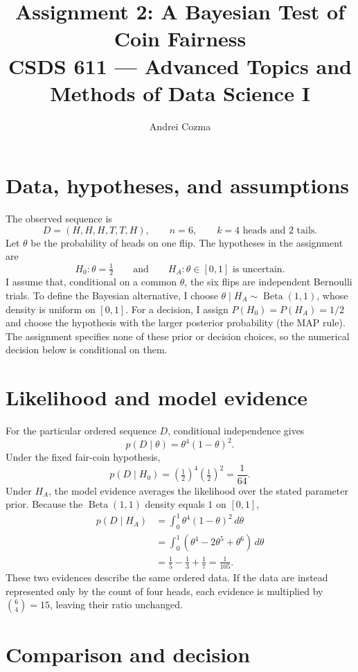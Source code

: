 \documentclass[11pt,letterpaper]{article}
\title{%
  Assignment 2: A Bayesian Test of Coin Fairness\\[0.4em]
  {\large CSDS 611 --- Advanced Topics and Methods of Data Science I}%
}
\author{Andrei Cozma}
\date{}
\begin{document}
\maketitle

\section*{Data, hypotheses, and assumptions}

The observed sequence is
\[
  D=(H,H,H,T,T,H),
  \qquad n=6,\qquad k=4\text{ heads and }2\text{ tails}.
\]
Let $\theta$ be the probability of heads on one flip. The hypotheses in the
assignment are
\[
  H_0:\theta=\tfrac12
  \qquad\text{and}\qquad
  H_A:\theta\in[0,1]\text{ is uncertain}.
\]
I assume that, conditional on a common $\theta$, the six flips are independent
Bernoulli trials. To define the Bayesian alternative, I choose
$\theta\mid H_A\sim\operatorname{Beta}(1,1)$, whose density is uniform on
$[0,1]$. For a decision, I assign $P(H_0)=P(H_A)=1/2$ and choose the hypothesis
with the larger posterior probability (the MAP rule). The assignment specifies
none of these prior or decision choices, so the numerical decision below is
conditional on them.

\section*{Likelihood and model evidence}

For the particular ordered sequence $D$, conditional independence gives
\[
  p(D\mid\theta)=\theta^4(1-\theta)^2.
\]
Under the fixed fair-coin hypothesis,
\[
  p(D\mid H_0)
  =\left(\tfrac12\right)^4\left(\tfrac12\right)^2
  =\frac{1}{64}.
\]
Under $H_A$, the model evidence averages the likelihood over the stated
parameter prior. Because the $\operatorname{Beta}(1,1)$ density equals $1$ on
$[0,1]$,
\begin{align*}
  p(D\mid H_A)
    &=\int_0^1 \theta^4(1-\theta)^2\,d\theta \\
    &=\int_0^1 (\theta^4-2\theta^5+\theta^6)\,d\theta \\
    &=\frac15-\frac13+\frac17
     =\frac{1}{105}.
\end{align*}
These two evidences describe the same ordered data. If the data are instead
represented only by the count of four heads, each evidence is multiplied by
$\binom64=15$, leaving their ratio unchanged.

\section*{Comparison and decision}
\end{document}
